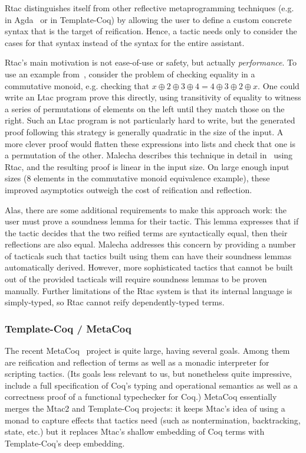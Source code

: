 Rtac distinguishes itself from other reflective metaprogramming techniques
(e.g. in Agda~\cite{agda-reflection} or in Template-Coq) by allowing the user to
define a custom concrete syntax that is the target of reification.
Hence, a tactic needs only to consider the cases for that syntax instead of the
syntax for the entire assistant.

Rtac's main motivation is not ease-of-use or safety, but actually
\emph{performance}.
To use an example from~\cite{rtac}, consider the problem of checking equality in
a commutative monoid, e.g. checking that $x \oplus 2 \oplus 3 \oplus 4 = 4
\oplus 3 \oplus 2 \oplus x$.
One could write an Ltac program prove this directly, using transitivity of
equality to witness a series of permutations of elements on the left until they
match those on the right.
Such an Ltac program is not particularly hard to write, but the generated proof
following this strategy is generally quadratic in the size of the input.
A more clever proof would flatten these expressions into lists and
check that one is a permutation of the other.
Malecha describes this technique in detail in~\cite{rtac} using Rtac, and the
resulting proof is linear in the input size.
On large enough input sizes (8 elements in the commutative monoid equivalence
example), these improved asymptotics outweigh the cost of reification and
reflection.

Alas, there are some additional requirements to make this approach work:
the user must prove a soundness lemma for their tactic.
This lemma expresses that if the tactic decides that the two reified terms
are syntactically equal, then their reflections are also equal.
Malecha addresses this concern by providing a number of tacticals such that
tactics built using them can have their soundness lemmas automatically
derived.
However, more sophisticated tactics that cannot be built out of the provided
tacticals will require soundness lemmas to be proven manually.
Further limitations of the Rtac system is that its internal language is
simply-typed, so Rtac cannot reify dependently-typed terms.

\subsubsection{Template-Coq / MetaCoq}

The recent MetaCoq~\cite{metacoq} project is quite large, having several goals.
Among them are reification and reflection of terms as well as a monadic
interpreter for scripting tactics.
(Its goals less relevant to us, but nonetheless quite impressive, include a full
specification of Coq's typing and operational semantics as well as a correctness
proof of a functional typechecker for Coq.)
MetaCoq essentially merges the Mtac2 and Template-Coq projects:
it keeps Mtac's idea of using a monad to capture effects that tactics need
(such as nontermination, backtracking, state, etc.) but it replaces Mtac's
shallow embedding of Coq terms with Template-Coq's deep embedding.

